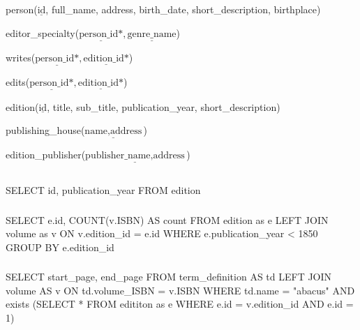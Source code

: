 \documentclass[11pt]{article}
\begin{document}
    \subsection{}

    person($\underline{\text{id}}$, full\_name, address, birth\_date, short\_description,
    birthplace)

    editor\_specialty($\underline{\text{person\_id*}}, \underline{\text{genre\_name}}$)

    writes($\underline{\text{person\_id*}}, \underline{\text{edition\_id*}}$)

    edits($\underline{\text{person\_id*}}, \underline{\text{edition\_id*}}$)

    edition($\underline{\text{id}}$, title, sub\_title, publication\_year,
    short\_description)

    publishing\_house($\underline{\text{name}, \text{address}}$)

    edition\_publisher($\underline{\text{publisher\_name}, \text{address}}$)

    \subsection{}

    \subsubsection{}

    SELECT id, publication\_year FROM edition

    \subsubsection{}

    SELECT e.id, COUNT(v.ISBN) AS count FROM edition as e LEFT JOIN volume as v ON
    v.edition\_id = e.id WHERE e.publication\_year < 1850
    GROUP BY e.edition\_id

    \subsubsection{}

    SELECT start\_page, end\_page FROM term\_definition AS td LEFT JOIN volume AS v ON td.volume\_ISBN = v.ISBN WHERE td.name = "abacus" AND exists (SELECT * FROM edititon as e WHERE e.id = v.edition\_id AND e.id = 1)

    \section{}
\end{document}
